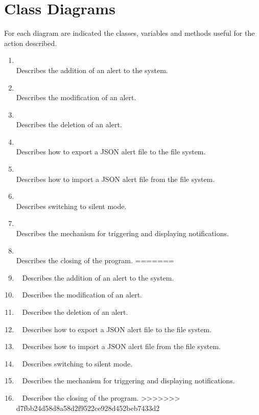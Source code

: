\chapter{Class Diagrams}\label{ch:class_diagrams}
For each diagram are indicated the classes, variables and methods useful for the action described.\\
\begin{enumerate}
<<<<<<< HEAD
    \item~\\Describes the addition of an alert to the system.
    \item~\\Describes the modification of an alert.
    \item~\\Describes the deletion of an alert.
    \item~\\Describes how to export a JSON alert file to the file system.
    \item~\\Describes how to import a JSON alert file from the file system.
    \item~\\Describes switching to silent mode.
    \item~\\Describes the mechanism for triggering and displaying notifications.
    \item~\\Describes the closing of the program.
=======
    \item~ Describes the addition of an alert to the system.
    \item~ Describes the modification of an alert.
    \item~ Describes the deletion of an alert.
    \item~ Describes how to export a JSON alert file to the file system.
    \item~ Describes how to import a JSON alert file from the file system.
    \item~ Describes switching to silent mode.
    \item~ Describes the mechanism for triggering and displaying notifications.
    \item~ Describes the closing of the program.
>>>>>>> d7fbb24d58d8a58d2f9522ce928d452beb7433d2
\end{enumerate}

